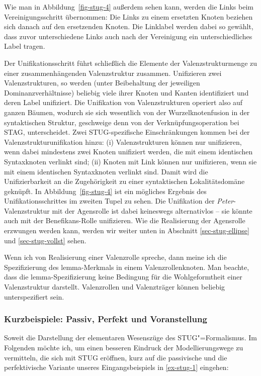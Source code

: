 Wie man in Abbildung~\ref{fig-stug-4} au\ss erdem sehen kann, werden die Links beim Vereinigungsschritt übernommen: Die Links zu einem ersetzten Knoten beziehen sich danach auf den ersetzenden Knoten. Die Linklabel werden dabei so gewählt, dass zuvor unterschiedene Links auch nach der Vereinigung ein unterschiedliches Label tragen. 

Der Unifikationsschritt führt schlie\ss lich die Elemente der Valenzstrukturmenge zu einer zusammenhängenden Valenzstruktur zusammen. Unifizieren zwei Valenzstrukturen, so werden (unter Beibehaltung der jeweiligen Dominanzverhältnisse) beliebig viele ihrer Knoten und Kanten identifiziert und deren Label unifiziert. Die Unifikation von Valenzstrukturen operiert also auf ganzen Bäumen, wodurch sie sich wesentlich von der Wurzelknotenfusion in der syntaktischen Struktur, geschweige denn von der Verknüpfungsoperation bei STAG, unterscheidet. Zwei STUG-spezifische Einschränkungen kommen bei der Valenzstrukturunifikation hinzu: (i) Valenzstrukturen können nur unifizieren, wenn dabei mindestens zwei Knoten unifiziert werden, die mit einem identischen Syntaxknoten verlinkt sind; (ii) Knoten mit Link können nur unifizieren, wenn sie mit einem identischen Syntaxknoten verlinkt sind. Damit wird die Unifizierbarkeit an die Zugehörigkeit zu einer syntaktischen Lokalitätsdomäne geknüpft. In Abbildung~\ref{fig-stug-4} ist ein mögliches Ergebnis des Unifikationsschrittes im zweiten Tupel zu sehen. Die Unifikation der {\it Peter}-Valenzstruktur mit der Agensrolle ist dabei keineswegs alternativlos -- sie könnte auch mit der Benefikans-Rolle unifizieren. Wie die Realisierung der Agensrolle erzwungen werden kann, werden wir weiter unten in Abschnitt \ref{sec-stug-ellipse} und \ref{sec-stug-vollst} sehen.


\clearpage 

Wenn ich von Realisierung einer Valenzrolle spreche, dann meine ich die Spezifizierung des {\sc lemma}-Merkmals in einem Valenzrollenknoten. Man beachte, dass die {\sc lemma}-Spezifizie\-rung keine Bedingung für die Wohlgeformtheit einer Valenzstruktur darstellt. Valenzrollen und Valenzträger können beliebig unterspezifiert sein.


\subsubsection*{Kurzbeispiele: Passiv, Perfekt und Voranstellung}

Soweit die Darstellung der elementaren Wesenszüge des STUG"=Formalismus. Im Folgenden möchte ich, um einen besseren Eindruck der Modellierungswege zu vermitteln, die sich mit STUG eröffnen, kurz auf die passivische und die perfektivische Variante unseres Eingangsbeispiels in \ref{ex-stug-1} eingehen:

